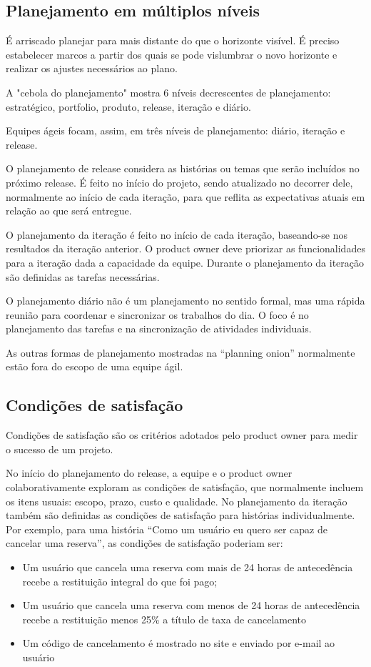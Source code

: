 \documentclass[a4paper,abntfigtabnum,noindentfirst]{abnt}
\begin{document}
\subsection{Planejamento em múltiplos níveis}

É arriscado planejar para mais distante do que o horizonte visível. É preciso estabelecer marcos a partir dos quais se pode vislumbrar o novo horizonte e realizar os ajustes necessários ao plano.

A "cebola do planejamento" mostra 6 níveis decrescentes de planejamento: estratégico, portfolio, produto, release, iteração e diário.

Equipes ágeis focam, assim, em três níveis de planejamento: diário, iteração e release.

O planejamento de release considera as histórias ou temas que serão incluídos no próximo release. É feito no início do projeto, sendo atualizado no decorrer dele, normalmente ao início de cada iteração, para que reflita as expectativas atuais em relação ao que será entregue.

O planejamento da iteração é feito no início de cada iteração, baseando-se nos resultados da iteração anterior. O product owner deve priorizar as funcionalidades para a iteração dada a capacidade da equipe. Durante o planejamento da iteração são definidas as tarefas necessárias.

O planejamento diário não é um planejamento no sentido formal, mas uma rápida reunião para coordenar e sincronizar os trabalhos do dia. O foco é no planejamento das tarefas e na sincronização de atividades individuais.

As outras formas de planejamento mostradas na ``planning onion'' normalmente estão fora do escopo de uma equipe ágil.


\subsection{Condições de satisfação}

Condições de satisfação são os critérios adotados pelo product owner para medir o sucesso de um projeto.

No início do planejamento do release, a equipe e o product owner colaborativamente exploram as condições de satisfação, que normalmente incluem os itens usuais: escopo, prazo, custo e qualidade. No planejamento da iteração também são definidas as condições de satisfação para histórias individualmente. Por exemplo, para uma história “Como um usuário eu quero ser capaz de cancelar uma reserva”, as condições de satisfação poderiam ser:
\begin{itemize}
\item Um usuário que cancela uma reserva com mais de 24 horas de antecedência recebe a restituição integral do que foi pago;
\item Um usuário que cancela uma reserva com menos de 24 horas de antecedência recebe a restituição menos 25\% a título de taxa de cancelamento
\item Um código de cancelamento é mostrado no site e enviado por e-mail ao usuário
\end{itemize}
\end{document}
